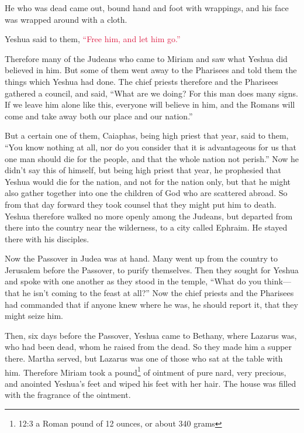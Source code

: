 \myverse{}He who was dead came out, bound hand and foot with wrappings,
and his face was wrapped around with a cloth.

Yeshua said to them,
\textcolor{crimson}{“Free him, and let him go.”}

\myverse{}Therefore many of the Judeans who came to Miriam and saw what
Yeshua did believed in him.
\myverse{}But some of them went away to the Pharisees and told them the things which
Yeshua had done.
\myverse{}The chief priests therefore and the Pharisees gathered a council, and said,
“What are we doing? For this man does many signs.
\myverse{}If we leave him alone like this, everyone will believe in him, and the Romans
will come and take away both our place and our nation.”

\myverse{}But a certain one of them, Caiaphas, being high priest that
year, said to them, “You know nothing at all,
\myverse{}nor do you consider that it is advantageous for us that one man should die
for the people, and that the whole nation not perish.”
\myverse{}Now he didn’t say this of himself, but being high priest that year, he prophesied
that Yeshua would die for the nation,
\myverse{}and not for the nation only, but that he might also gather together into
one the children of God who are scattered abroad.
\myverse{}So from that day forward they took counsel that they might put him to death.
\myverse{}Yeshua therefore walked no more openly among the Judeans, but departed from
there into the country near the wilderness, to a city called Ephraim. He stayed there with his disciples.

\myverse{}Now the Passover in Judea was at hand. Many went up from the
country to Jerusalem before the Passover, to purify themselves.
\myverse{}Then they sought for Yeshua and spoke with one another as they stood in the
temple, “What do you think—that he isn’t coming to the feast at all?”
\myverse{}Now the chief priests and the Pharisees had commanded that if anyone knew
where he was, he should report it, that they might seize him.


\mychapter{} \myverse*{}Then, six days before the Passover, Yeshua came to Bethany, where
Lazarus was, who had been dead, whom he raised from the dead.
\myverse{}So they made him a supper there. Martha served, but Lazarus was one of those
who sat at the table with him.
\myverse{}Therefore Miriam took a pound\footnote{12:3 a Roman pound of 12 ounces, or about 340 grams} of ointment of pure nard, very precious,
and anointed Yeshua’s feet and wiped his feet with her hair. The house was filled with the fragrance of
the ointment.

